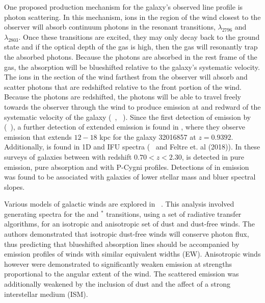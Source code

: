 \documentclass[twocolumn]{aastex61}
\newcommand{\citeth}[1]{(\citeauthor{#1}\ \citeyear{#1})}
\newcommand{\citethnop}[1]{\citeauthor{#1}\ \citeyear{#1}}
\begin{document}
One proposed production mechanism for the galaxy's observed  line profile is photon scattering. In this mechanism,  ions in the region of the wind closest to the observer will absorb continuum photons in the resonant transitions, $\lambda_{2796}$ and $\lambda_{2803}$. Once these transitions are excited, they may only decay back to the ground state and if the optical depth of the gas is high, then the gas will resonantly trap the absorbed photons. Because the photons are absorbed in the rest frame of the gas, the absorption will be blueshifted relative to the galaxy's systematic velocity. The  ions in the section of the wind farthest from the observer will absorb and scatter photons that are redshifted relative to the front portion of the wind. Because the photons are redshifted, the photons will be able to travel freely towards the observer through the wind to produce emission at and redward of the systematic velocity of the galaxy (\citethnop{Rubin_2011}, \citethnop{Prochaska_2011}). Since the first detection of  emission by \citeth{Rubin_2011}, a further detection of extended  emission is found in \cite{Martin2013}, where they observe  emission that extends $12-18$ kpc for the galaxy 32016857 at $z=0.9392$. Additionally,  is found in 1D and IFU spectra (\citethnop{Erb2012} and Feltre et. al (2018)). In these surveys of galaxies between with redshift $ 0.70 < z < 2.30$,  is detected in pure emission, pure absorption and with P-Cygni profiles. Detections of  in emission was found to be associated with galaxies of lower stellar mass and bluer spectral slopes.

Various models of galactic winds are explored in \citethnop{Prochaska_2011}. This analysis involved generating spectra for the   and  $^*$ transitions, using a set of radiative transfer algorithms, for an isotropic and anisotropic set of dust and dust-free winds. The authors demonstrated that isotropic dust-free winds will conserve photon flux, thus predicting that blueshifted absorption lines should be accompanied by emission profiles of winds with similar equivalent widths (EW). Anisotropic winds however were demonstrated to significantly weaken emission at strengths proportional to the angular extent of the wind. The scattered emission was additionally weakened by the inclusion of dust and the affect of a strong interstellar medium (ISM).
\end{document}
